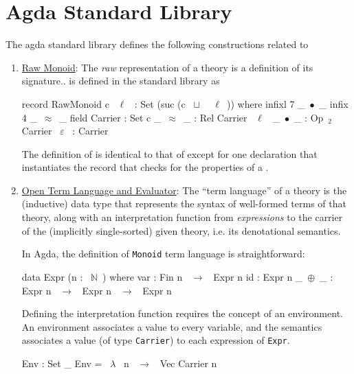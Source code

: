 \section{Agda Standard Library}
The agda standard library defines the following constructions related to  
\begin{enumerate}
\item \href{https://github.com/agda/agda-stdlib/blob/4099f6184a7d8cd4c02931c3ef5a95966ab4cbb6/src/Algebra/Bundles.agda}{Raw Monoid}: The \emph{raw} representation of a theory is a definition of its signature..  is defined in the standard library as 
\begin{agdacode} 
record RawMonoid c ~$\ell$~ : Set (suc (c ~$\sqcup$~ ~$\ell$~)) where 
  infixl 7 _~$\bullet$~_
  infix 4 _~$\approx$~_
  field 
   Carrier : Set c 
   _~$\approx$~_ : Rel Carrier ~$\ell$~ 
   _~$\bullet$~_ : Op~$_2$~ Carrier 
   ~$\varepsilon$~   : Carrier 
\end{agdacode} 
The definition of  is identical to that of  except for one declaration that instantiates the  record that checks for the properties of a . 

\item \href{https://github.com/agda/agda-stdlib/blob/c61b159363ce2390049ce8e1e5422f61f17ec3b7/src/Algebra/Solver/Monoid.agda}{Open Term Language and Evaluator}:
The ``term language'' of a theory is the (inductive) data type
that represents the syntax of well-formed terms of that theory,
along with an interpretation function from \emph{expressions} 
to the carrier of the (implicitly single-sorted) given theory, i.e.
its denotational semantics.

In Agda, the definition of \lstinline|Monoid| term language is straightforward:
\begin{agdacode}
data Expr (n : ~$\mathbb{N}$~) where 
  var : Fin n ~$\to$~ Expr n 
  id : Expr n 
  _~$\oplus$~_ : Expr n ~$\to$~ Expr n ~$\to$~ Expr n 
\end{agdacode}
Defining the interpretation function requires the concept of an environment.
An environment associates a value to every variable, and the semantics
associates a value (of type \verb|Carrier|) to each expression of \verb|Expr|.
\begin{agdacode}
Env : Set _ 
Env = ~$\lambda$~ n ~$\rightarrow$~ Vec Carrier n 


\end{agdacode}
\end{enumerate}
